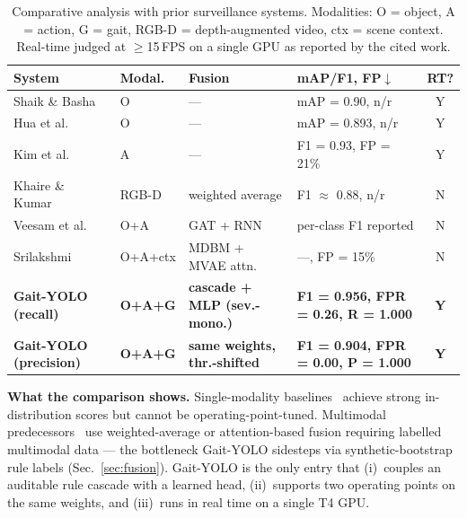 \documentclass[runningheads]{llncs}
\begin{document}
\begin{table}[!htbp]
\caption{Comparative analysis with prior surveillance systems. Modalities: O = object, A = action, G = gait, RGB-D = depth-augmented video, ctx = scene context. Real-time judged at $\geq$15\,FPS on a single GPU as reported by the cited work.}
\label{tab:compare}
\centering
\footnotesize
\setlength{\tabcolsep}{3pt}
\begin{tabular}{@{}p{3.0cm}p{1.3cm}p{2.6cm}p{3.3cm}c@{}}
\toprule
\textbf{System} & \textbf{Modal.} & \textbf{Fusion} & \textbf{mAP/F1, FP$\downarrow$} & \textbf{RT?}\\
\midrule
Shaik \& Basha~\cite{shaik2025}        & O          & ---                          & mAP = 0.90, n/r              & Y\\
Hua et al.~\cite{hua2024}              & O          & ---                          & mAP = 0.893, n/r             & Y\\
Kim et al.~\cite{kim2024}              & A          & ---                          & F1 = 0.93, FP = 21\%         & Y\\
Khaire \& Kumar~\cite{khaire2022}      & RGB-D      & weighted average             & F1 $\approx$ 0.88, n/r       & N\\
Veesam et al.~\cite{veesam2025}        & O+A        & GAT + RNN                    & per-class F1 reported        & N\\
Srilakshmi~\cite{srilakshmi2025}       & O+A+ctx    & MDBM + MVAE attn.            & ---, FP = 15\%               & N\\
\midrule
\textbf{Gait-YOLO (recall)}            & \textbf{O+A+G} & \textbf{cascade + MLP (sev.-mono.)} & \textbf{F1 = 0.956, FPR = 0.26, R = 1.000} & \textbf{Y}\\
\textbf{Gait-YOLO (precision)}         & \textbf{O+A+G} & \textbf{same weights, thr.-shifted} & \textbf{F1 = 0.904, FPR = 0.00, P = 1.000} & \textbf{Y}\\
\bottomrule
\end{tabular}
\end{table}

\textbf{What the comparison shows.} Single-modality baselines~\cite{shaik2025,hua2024,kim2024} achieve strong in-distribution scores but cannot be operating-point-tuned. Multimodal predecessors~\cite{khaire2022,srilakshmi2025,veesam2025} use weighted-average or attention-based fusion requiring labelled multimodal data --- the bottleneck Gait-YOLO sidesteps via synthetic-bootstrap rule labels (Sec.~\ref{sec:fusion}). Gait-YOLO is the only entry that (i)~couples an auditable rule cascade with a learned head, (ii)~supports two operating points on the same weights, and (iii)~runs in real time on a single T4 GPU.
\end{document}
